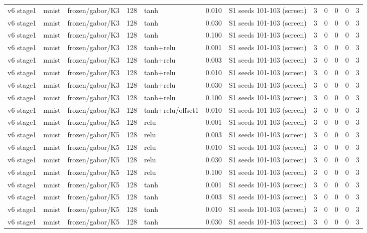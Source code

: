 \begin{table}[htbp]
{\begin{tabular}{@{}lllrlrlrrrrr@{}}
v6 stage1 & mnist & frozen/gabor/K3 & 128 & tanh & 0.010 & S1 seeds 101-103 (screen) & 3 & 0 & 0 & 0 & 3 \\
v6 stage1 & mnist & frozen/gabor/K3 & 128 & tanh & 0.030 & S1 seeds 101-103 (screen) & 3 & 0 & 0 & 0 & 3 \\
v6 stage1 & mnist & frozen/gabor/K3 & 128 & tanh & 0.100 & S1 seeds 101-103 (screen) & 3 & 0 & 0 & 0 & 3 \\
v6 stage1 & mnist & frozen/gabor/K3 & 128 & tanh+relu & 0.001 & S1 seeds 101-103 (screen) & 3 & 0 & 0 & 0 & 3 \\
v6 stage1 & mnist & frozen/gabor/K3 & 128 & tanh+relu & 0.003 & S1 seeds 101-103 (screen) & 3 & 0 & 0 & 0 & 3 \\
v6 stage1 & mnist & frozen/gabor/K3 & 128 & tanh+relu & 0.010 & S1 seeds 101-103 (screen) & 3 & 0 & 0 & 0 & 3 \\
v6 stage1 & mnist & frozen/gabor/K3 & 128 & tanh+relu & 0.030 & S1 seeds 101-103 (screen) & 3 & 0 & 0 & 0 & 3 \\
v6 stage1 & mnist & frozen/gabor/K3 & 128 & tanh+relu & 0.100 & S1 seeds 101-103 (screen) & 3 & 0 & 0 & 0 & 3 \\
v6 stage1 & mnist & frozen/gabor/K3 & 128 & tanh+relu/offset1 & 0.010 & S1 seeds 101-103 (screen) & 3 & 0 & 0 & 0 & 3 \\
v6 stage1 & mnist & frozen/gabor/K5 & 128 & relu & 0.001 & S1 seeds 101-103 (screen) & 3 & 0 & 0 & 0 & 3 \\
v6 stage1 & mnist & frozen/gabor/K5 & 128 & relu & 0.003 & S1 seeds 101-103 (screen) & 3 & 0 & 0 & 0 & 3 \\
v6 stage1 & mnist & frozen/gabor/K5 & 128 & relu & 0.010 & S1 seeds 101-103 (screen) & 3 & 0 & 0 & 0 & 3 \\
v6 stage1 & mnist & frozen/gabor/K5 & 128 & relu & 0.030 & S1 seeds 101-103 (screen) & 3 & 0 & 0 & 0 & 3 \\
v6 stage1 & mnist & frozen/gabor/K5 & 128 & relu & 0.100 & S1 seeds 101-103 (screen) & 3 & 0 & 0 & 0 & 3 \\
v6 stage1 & mnist & frozen/gabor/K5 & 128 & tanh & 0.001 & S1 seeds 101-103 (screen) & 3 & 0 & 0 & 0 & 3 \\
v6 stage1 & mnist & frozen/gabor/K5 & 128 & tanh & 0.003 & S1 seeds 101-103 (screen) & 3 & 0 & 0 & 0 & 3 \\
v6 stage1 & mnist & frozen/gabor/K5 & 128 & tanh & 0.010 & S1 seeds 101-103 (screen) & 3 & 0 & 0 & 0 & 3 \\
v6 stage1 & mnist & frozen/gabor/K5 & 128 & tanh & 0.030 & S1 seeds 101-103 (screen) & 3 & 0 & 0 & 0 & 3 \\

\end{tabular}}
\end{table}
